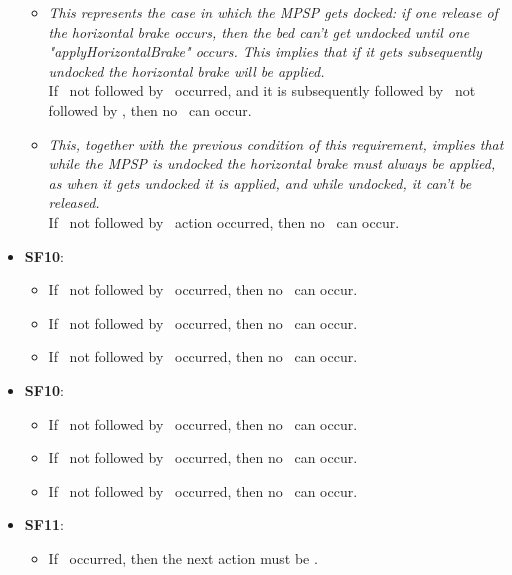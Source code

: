 \begin{itemize}
\begin{itemize}
        \item \textit{This represents the case in which the MPSP gets docked: if one release of the horizontal brake occurs, then the bed can't get undocked until one "applyHorizontalBrake" occurs. This implies that if it gets subsequently undocked the horizontal brake will be applied.}\\
        If \dock\ not followed by \undock\ occurred,  and it is subsequently followed by \releaseHorizontalBrake\ not followed by \applyHorizontalBrake, then no \undock\ can occur.

        \item \textit{This, together with the previous condition of this requirement, implies that while the MPSP is undocked the horizontal brake must always be applied, as when it gets undocked it is applied, and while undocked, it can't be released.}\\
        If \undock\ not followed by \dock\ action occurred, then no \releaseHorizontalBrake\ can occur.
    \end{itemize}

    \item \textbf{SF10}:
    \begin{itemize}

        \item If \uppermostReached\ not followed by \motorDown\ occurred, then no \motorUp\ can occur.

        \item If \lowermostReached\ not followed by \motorUp\ occurred, then no \motorDown\ can occur.

        \item If \leftmostReached\ not followed by \motorRight\ occurred, then no \motorLeft\ can occur.


    \end{itemize}
    \item \textbf{SF10}:
    \begin{itemize}

        \item If \uppermostReached\ not followed by \motorDown\ occurred, then no \motorUp\ can occur.

        \item If \lowermostReached\ not followed by \motorUp\ occurred, then no \motorDown\ can occur.

        \item If \leftmostReached\ not followed by \motorRight\ occurred, then no \motorLeft\ can occur.
    \end{itemize}
    \item \textbf{SF11}:
    \begin{itemize}
        \item If \verticalMotorOff\ occurred, then the next action must be \applyVerticalBrake.


\end{itemize}
\end{itemize}
